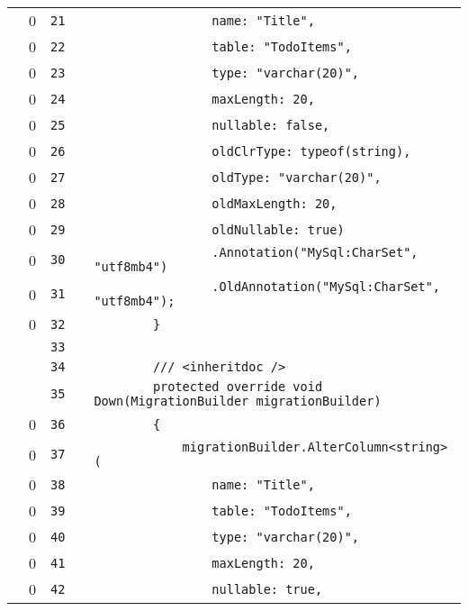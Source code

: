 \documentclass[a4paper,landscape,10pt]{article}
\begin{document}
\begin{longtable}[l]{lrrll}
\cellcolor{red} & 0 & \verb~21~ & & \verb~                name: "Title",~\\
\cellcolor{red} & 0 & \verb~22~ & & \verb~                table: "TodoItems",~\\
\cellcolor{red} & 0 & \verb~23~ & & \verb~                type: "varchar(20)",~\\
\cellcolor{red} & 0 & \verb~24~ & & \verb~                maxLength: 20,~\\
\cellcolor{red} & 0 & \verb~25~ & & \verb~                nullable: false,~\\
\cellcolor{red} & 0 & \verb~26~ & & \verb~                oldClrType: typeof(string),~\\
\cellcolor{red} & 0 & \verb~27~ & & \verb~                oldType: "varchar(20)",~\\
\cellcolor{red} & 0 & \verb~28~ & & \verb~                oldMaxLength: 20,~\\
\cellcolor{red} & 0 & \verb~29~ & & \verb~                oldNullable: true)~\\
\cellcolor{red} & 0 & \verb~30~ & & \verb~                .Annotation("MySql:CharSet", "utf8mb4")~\\
\cellcolor{red} & 0 & \verb~31~ & & \verb~                .OldAnnotation("MySql:CharSet", "utf8mb4");~\\
\cellcolor{red} & 0 & \verb~32~ & & \verb~        }~\\
\cellcolor{gray} &  & \verb~33~ & & \verb~~\\
\cellcolor{gray} &  & \verb~34~ & & \verb~        /// <inheritdoc />~\\
\cellcolor{gray} &  & \verb~35~ & & \verb~        protected override void Down(MigrationBuilder migrationBuilder)~\\
\cellcolor{red} & 0 & \verb~36~ & & \verb~        {~\\
\cellcolor{red} & 0 & \verb~37~ & & \verb~            migrationBuilder.AlterColumn<string>(~\\
\cellcolor{red} & 0 & \verb~38~ & & \verb~                name: "Title",~\\
\cellcolor{red} & 0 & \verb~39~ & & \verb~                table: "TodoItems",~\\
\cellcolor{red} & 0 & \verb~40~ & & \verb~                type: "varchar(20)",~\\
\cellcolor{red} & 0 & \verb~41~ & & \verb~                maxLength: 20,~\\
\cellcolor{red} & 0 & \verb~42~ & & \verb~                nullable: true,~\\

\end{longtable}
\end{document}
